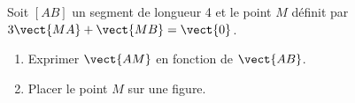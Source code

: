 
\begin{exercice}\label{exosmath-0072}

    Soit \( [AB]\) un segment de longueur \unit{4}{\centi\meter} et le point \( M\) définit par \( 3\vect{ MA }+\vect{ MB }=\vect{ 0 }\).
    \begin{enumerate}
        \item
            Exprimer \( \vect{ AM }\) en fonction de \( \vect{ AB }\).
        \item
            Placer le point \( M\) sur une figure.
    \end{enumerate}

\end{exercice}
